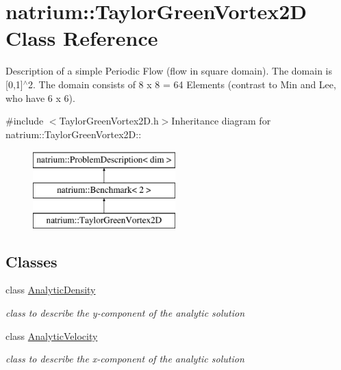 \hypertarget{classnatrium_1_1TaylorGreenVortex2D}{
\section{natrium::TaylorGreenVortex2D Class Reference}
\label{classnatrium_1_1TaylorGreenVortex2D}
}


Description of a simple Periodic Flow (flow in square domain). The domain is \mbox{[}0,1\mbox{]}$^\wedge$2. The domain consists of 8 x 8 = 64 Elements (contrast to Min and Lee, who have 6 x 6).  


{\ttfamily \#include $<$TaylorGreenVortex2D.h$>$}Inheritance diagram for natrium::TaylorGreenVortex2D::\begin{figure}[H]
\begin{center}
\leavevmode
\includegraphics[height=3cm]{classnatrium_1_1TaylorGreenVortex2D}
\end{center}
\end{figure}
\subsection*{Classes}
\begin{DoxyCompactItemize}
\item 
class \hyperlink{classnatrium_1_1TaylorGreenVortex2D_1_1AnalyticDensity}{AnalyticDensity}
\begin{DoxyCompactList}\small\item\em class to describe the y-\/component of the analytic solution \item\end{DoxyCompactList}\item 
class \hyperlink{classnatrium_1_1TaylorGreenVortex2D_1_1AnalyticVelocity}{AnalyticVelocity}
\begin{DoxyCompactList}\small\item\em class to describe the x-\/component of the analytic solution \item\end{DoxyCompactList}\end{DoxyCompactItemize}
